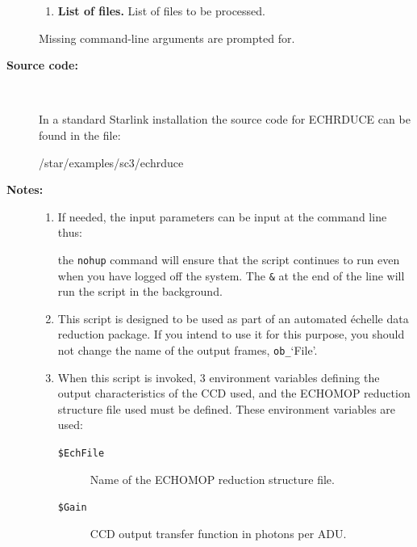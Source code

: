 \documentclass[twoside,11pt]{starlink}
\begin{document}
\begin{description}
\begin{enumerate}
\item \textbf{List of files.}
      List of files to be processed.

\end{enumerate}

     Missing command-line arguments are prompted for.

\item [\textbf{Source code:}] \mbox{} \\
\begin{latexonly}
In a standard Starlink installation the source code for ECHRDUCE can be found
in the file:
\begin{terminalv}
   /star/examples/sc3/echrduce
\end{terminalv}
\end{latexonly}



\item [\textbf{Notes:}] \mbox{}
\begin{enumerate}

\item If needed, the input parameters can be input at the command
      line thus:

\begin{terminalv}
\end{terminalv}

      the \verb+nohup+ command will ensure that the script continues
      to run even when you have logged off the system.  The \verb+&+ at
      the end of the line will run the script in the background.

\item This script is designed to be used as part of an automated
      \'{e}chelle data reduction package.  If you intend to use it
      for this purpose, you should not change the name of the output
      frames, \verb+ob_+`File'.

\item When this script is invoked, 3 environment variables defining
      the output characteristics of the CCD used, and the ECHOMOP
      reduction structure file used must be defined.
      These environment variables are used:

\begin{description}

\item [{\tt{\$EchFile}}]
      Name of the ECHOMOP reduction structure file.

\item [{\tt{\$Gain}}]
      CCD output transfer function in photons per ADU.


\end{description}
\end{enumerate}
\end{description}
\end{document}
